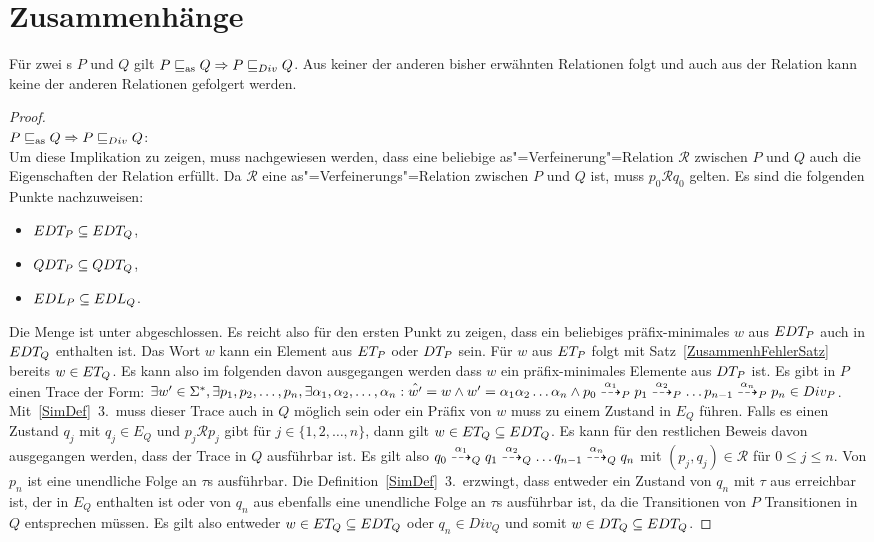 \section{Zusammenhänge}

\begin{Satz}
  Für zwei \MEIO{}s $P$ und $Q$ gilt $P \sqsubseteq _{\mathrm{as}} Q \Rightarrow P  \sqsubseteq  _{Div} Q$. Aus
  keiner der anderen bisher erwähnten Relationen folgt \DRel{} und auch aus der
  Relation \DRel{} kann keine der anderen Relationen gefolgert werden.
\end{Satz}
\begin{proof}\mbox{}\\
  $P \sqsubseteq _{\mathrm{as}} Q \Rightarrow P  \sqsubseteq  _{Div} Q$:\\
  Um diese Implikation zu zeigen, muss nachgewiesen werden, dass eine beliebige
  as"=Verfeinerung"=Relation $\mathcal{R}$ zwischen $P$ und $Q$ auch die
  Eigenschaften der Relation \DRel{} erfüllt. Da $\mathcal{R}$ eine
  as"=Verfeinerungs"=Relation zwischen $P$ und $Q$ ist, muss $p_0 \mathcal{R}
  q_0$ gelten. Es sind die folgenden Punkte nachzuweisen:
  \begin{itemize}
    \item $EDT _P \subseteq EDT _Q$,
    \item $QDT _P \subseteq QDT _Q$,
    \item $EDL _P \subseteq EDL _Q$.
  \end{itemize}

  Die Menge \EDT{} ist unter \cont{} abgeschlossen. Es reicht also für den
  ersten Punkt zu zeigen, dass ein beliebiges präfix-minimales $w$ aus $EDT
  _P$ auch in $EDT _Q$ enthalten ist. Das Wort $w$ kann ein Element aus $ET
  _P$ oder $DT _P$ sein. Für $w$ aus $ET _P$ folgt mit
  Satz~\ref{ZusammenhFehlerSatz} bereits $w\in ET _Q$. Es kann also im
  folgenden davon ausgegangen werden dass $w$ ein präfix-minimales Elemente aus
  $DT _P$ ist. Es gibt in $P$ einen Trace der Form: $\exists w'\in\Sigma ^*,
  \exists p_1, p_2, \dots , p_n, \exists \alpha _1, \alpha _2, \dots ,\alpha
  _n: \hat{w'} = w \land w' = \alpha _1\alpha _2\dots\alpha _n \land p_0
  \may[\alpha _1]_P p_1 \may[\alpha _2]_P \dots p_{n-1} \may[\alpha _n]_P p_n
  \in Div _P$. Mit~\ref{SimDef}~3.\ muss dieser Trace auch in $Q$ möglich sein
  oder ein Präfix von $w$ muss zu einem Zustand in $E_Q$ führen. Falls es einen
  Zustand $q_j$ mit $q_j\in E_Q$ und $p_j \mathcal{R} p_j$ gibt für
  $j\in\{1,2,\dots ,n\}$, dann gilt $w\in ET _Q \subseteq EDT _Q$. Es kann
  für den restlichen Beweis davon ausgegangen werden, dass der Trace in $Q$
  ausführbar ist. Es gilt also $q_0 \may[\alpha _1]_Q q_1 \may[\alpha _2]_Q
  \dots q_{n-1} \may[\alpha _n]_Q q_n$ mit $(p_j,q_j)\in\mathcal{R}$ für $0\leq
  j \leq n$. Von $p_n$ ist eine unendliche Folge an $\tau$s ausführbar. Die
  Definition~\ref{SimDef}~3.\ erzwingt, dass entweder ein Zustand von $q_n$ mit
  $\tau$ aus erreichbar ist, der in $E_Q$ enthalten ist oder von $q_n$ aus
  ebenfalls eine unendliche Folge an $\tau$s ausführbar ist, da die
  Transitionen von $P$ Transitionen in $Q$ entsprechen müssen. Es gilt also
  entweder $w\in ET _Q\subseteq EDT _Q$ oder $q_n\in Div _Q$ und somit $w\in DT
  _Q\subseteq EDT _Q$.


\end{proof}
